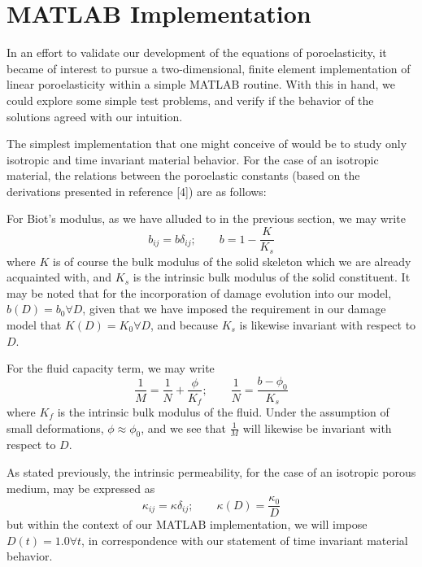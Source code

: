 \documentclass[11pt]{article} %
\begin{document}
\section{MATLAB Implementation}

In an effort to validate our development of the equations of poroelasticity, it became of interest to pursue a two-dimensional, finite element implementation of linear poroelasticity within a simple MATLAB routine. With this in hand, we could explore some simple test problems, and verify if the behavior of the solutions agreed with our intuition.

The simplest implementation that one might conceive of would be to study only isotropic and time invariant material behavior. For the case of an isotropic material, the relations between the poroelastic constants (based on the derivations presented in reference [4]) are as follows:

For Biot's modulus, as we have alluded to in the previous section, we may write
\begin{equation}
	b_{ij} = b \delta_{ij}; \qquad b = 1 - \frac{K}{K_s}
\end{equation}
where $K$ is of course the bulk modulus of the solid skeleton which we are already acquainted with, and $K_s$ is the intrinsic bulk modulus of the solid constituent. It may be noted that for the incorporation of damage evolution into our model, $b(D) = b_0 \forall D$, given that we have imposed the requirement in our damage model that $K(D) = K_0 \forall D$, and because $K_s$ is likewise invariant with respect to $D$.

For the fluid capacity term, we may write
\begin{equation}
	\frac{1}{M} = \frac{1}{N} + \frac{\phi}{K_f}; \qquad \frac{1}{N} = \frac{b - \phi_0}{K_s}
\end{equation}
where $K_f$ is the intrinsic bulk modulus of the fluid. Under the assumption of small deformations, $\phi \approx \phi_0$, and we see that $\frac{1}{M}$ will likewise be invariant with respect to $D$.

As stated previously, the intrinsic permeability, for the case of an isotropic porous medium, may be expressed as
\begin{equation}
	\kappa_{ij} = \kappa \delta_{ij}; \qquad \kappa(D) = \frac{\kappa_0}{D}
\end{equation}
but within the context of our MATLAB implementation, we will impose $D(t) = 1.0 \forall t$, in correspondence with our statement of time invariant material behavior.
\end{document}

